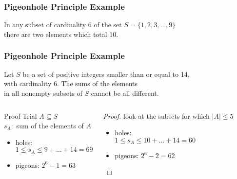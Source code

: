 \documentclass[dvipsnames]{beamer}
\begin{document}
\begin{frame}
  \frametitle{Pigeonhole Principle Example}

  \begin{theorem}
    In any subset of cardinality 6 of the set $S = \{1,2,3,\dots,9\}$\\
    there are two elements which total 10.
  \end{theorem}
\end{frame}

\begin{frame}
  \frametitle{Pigeonhole Principle Example}

  \begin{theorem}
    Let $S$ be a set of positive integers smaller than or equal to 14,\\
    with cardinality 6. The sums of the elements\\
    in all nonempty subsets of $S$ cannot be all different.
  \end{theorem}

  \pause
  \begin{columns}[t]
    \begin{block}{Proof Trial}
      $A \subseteq S$\\
      $s_A:$ sum of the elements of $A$

      \pause
      \begin{itemize}
        \item holes:\\
          $1 \leq s_A \leq 9 + \dots + 14 = 69$
        \item pigeons: $2^6 - 1 = 63$
      \end{itemize}
    \end{block}

    \pause
    \begin{proof}
      look at the subsets for which $|A| \leq 5$

      \pause
      \begin{itemize}
        \item holes:\\
          $1 \leq s_A \leq 10 + \dots + 14 = 60$
        \item pigeons: $2^6 - 2 = 62$
      \end{itemize}
    \end{proof}
  \end{columns}
\end{frame}
\end{document}
